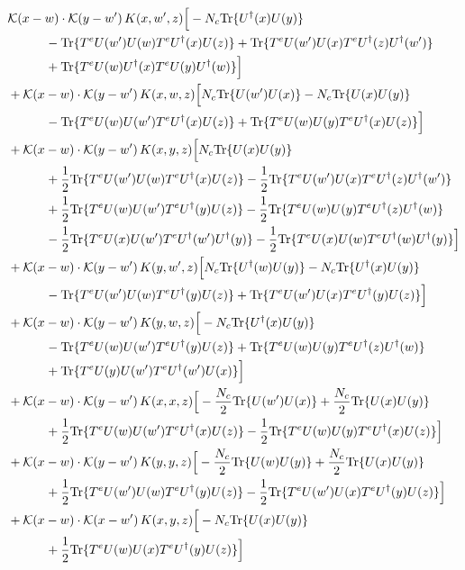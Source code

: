 \documentclass[10pt]{article}
\numberwithin{equation}{section}
\begin{document}
\begin{align}
&\mathcal K(x-w)\cdot\mathcal K(y-w')\,K(x,w',z)\Big[-N_c{\rm Tr}\{U^\dagger(x)U(y)\}\notag\\
&\quad\quad\quad-{\rm Tr}\{T^eU(w')U(w)T^eU^\dagger(x)U(z)\}+{\rm Tr}\{T^eU(w')U(x)T^eU^\dagger(z)U^\dagger(w')\}\notag\\
&\quad\quad\quad+{\rm Tr}\{T^eU(w)U^\dagger(x)T^eU(y)U^\dagger(w)\}\Big]\notag\\
&+\mathcal K(x-w)\cdot\mathcal K(y-w')\,K(x,w,z)\Big[N_c{\rm Tr}\{U(w')U(x)\}-N_c{\rm Tr}\{U(x)U(y)\}\notag\\
&\quad\quad\quad-{\rm Tr}\{T^eU(w)U(w')T^eU^\dagger(x)U(z)\}+{\rm Tr}\{T^eU(w)U(y)T^eU^\dagger(x)U(z)\}\Big]\notag\\
&+\mathcal K(x-w)\cdot\mathcal K(y-w')\,K(x,y,z)\Big[N_c{\rm Tr}\{U(x)U(y)\}\notag\\
&\quad\quad\quad+\frac{1}{2}{\rm Tr}\{T^eU(w')U(w)T^eU^\dagger(x)U(z)\}-\frac{1}{2}{\rm Tr}\{T^eU(w')U(x)T^eU^\dagger(z)U^\dagger(w')\}\notag\\
&\quad\quad\quad+\frac{1}{2}{\rm Tr}\{T^eU(w)U(w')T^eU^\dagger(y)U(z)\}-\frac{1}{2}{\rm Tr}\{T^eU(w)U(y)T^eU^\dagger(z)U^\dagger(w)\}\notag\\
&\quad\quad\quad-\frac{1}{2}{\rm Tr}\{T^eU(x)U(w')T^eU^\dagger(w')U^\dagger(y)\}-\frac{1}{2}{\rm Tr}\{T^eU(x)U(w)T^eU^\dagger(w)U^\dagger(y)\}\Big]\notag\\
&+\mathcal K(x-w)\cdot\mathcal K(y-w')\,K(y,w',z)\Big[N_c{\rm Tr}\{U^\dagger(w)U(y)\}-N_c{\rm Tr}\{U^\dagger(x)U(y)\}\notag\\
&\quad\quad\quad-{\rm Tr}\{T^eU(w')U(w)T^eU^\dagger(y)U(z)\}+{\rm Tr}\{T^eU(w')U(x)T^eU^\dagger(y)U(z)\}\Big]\notag\\
&+\mathcal K(x-w)\cdot\mathcal K(y-w')\,K(y,w,z)\Big[-N_c{\rm Tr}\{U^\dagger(x)U(y)\}\notag\\
&\quad\quad\quad-{\rm Tr}\{T^eU(w)U(w')T^eU^\dagger(y)U(z)\}+{\rm Tr}\{T^eU(w)U(y)T^eU^\dagger(z)U^\dagger(w)\}\notag\\
&\quad\quad\quad+{\rm Tr}\{T^eU(y)U(w')T^eU^\dagger(w')U(x)\}\Big]\notag\\
&+\mathcal K(x-w)\cdot\mathcal K(y-w')\,K(x,x,z)\Big[-\frac{N_c}{2}{\rm Tr}\{U(w')U(x)\}+\frac{N_c}{2}{\rm Tr}\{U(x)U(y)\}\notag\\
&\quad\quad\quad+\frac{1}{2}{\rm Tr}\{T^eU(w)U(w')T^eU^\dagger(x)U(z)\}-\frac{1}{2}{\rm Tr}\{T^eU(w)U(y)T^eU^\dagger(x)U(z)\}\Big]\notag\\
&+\mathcal K(x-w)\cdot\mathcal K(y-w')\,K(y,y,z)\Big[-\frac{N_c}{2}{\rm Tr}\{U(w)U(y)\}+\frac{N_c}{2}{\rm Tr}\{U(x)U(y)\}\notag\\
&\quad\quad\quad+\frac{1}{2}{\rm Tr}\{T^eU(w')U(w)T^eU^\dagger(y)U(z)\}-\frac{1}{2}{\rm Tr}\{T^eU(w')U(x)T^eU^\dagger(y)U(z)\}\Big]\notag\\
&+\mathcal K(x-w)\cdot\mathcal K(x-w')\,K(x,y,z)\Big[-N_c{\rm Tr}\{U(x)U(y)\}\notag\\
&\quad\quad\quad+\frac{1}{2}{\rm Tr}\{T^eU(w)U(x)T^eU^\dagger(y)U(z)\}\Big]
\label{eq:list10}
\end{align}
\end{document}
